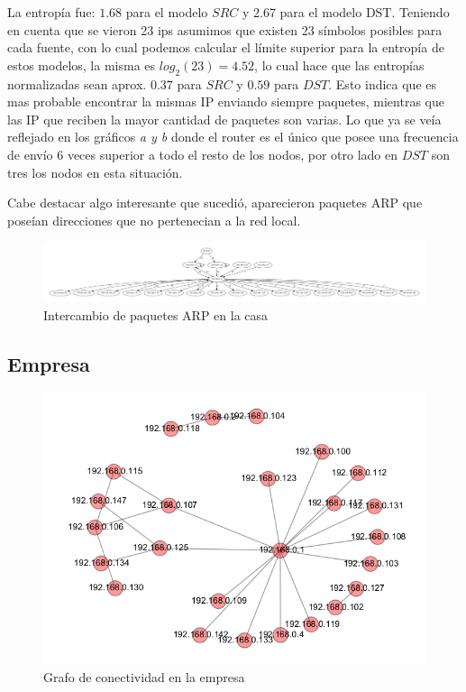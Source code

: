 La entrop\'ia fue: $1.68$ para el modelo $SRC$ y $2.67$ para el modelo DST.
Teniendo en cuenta que se vieron 23 ips asumimos que existen 23 s\'imbolos
posibles para cada fuente, con lo cual podemos calcular el l\'imite
superior para la entrop\'ia de estos modelos, la misma es $log_2(23)=4.52$, lo 
cual hace que las entrop\'ias normalizadas sean aprox. $0.37$ para $SRC$ y 
$0.59$ para $DST$. Esto indica que es mas probable encontrar la mismas 
IP enviando siempre paquetes, mientras que las IP que reciben la mayor
cantidad de paquetes son varias. Lo que ya se ve\'ia reflejado en los gr\'aficos
\emph{a y b} donde el router es el \'unico que posee una frecuencia de
env\'io 6 veces superior a todo el resto de los nodos, por otro lado en $DST$
son tres los nodos en esta situaci\'on.

Cabe destacar algo interesante que sucedi\'o, aparecieron paquetes ARP que
pose\'ian direcciones que no pertenecian a la red local.


\begin{figure}[!h]
	  \hspace{-5em}
	  \includegraphics[scale=0.25]{resultados/casa/conectividad.pdf}
	  \caption{Intercambio de paquetes ARP en la casa}
	  \label{fig:contra1}
\end{figure}


\subsection{Empresa}

\begin{figure}[!h]
	\begin{center}
		  \includegraphics[scale=0.6]{resultados/empresa/conectividadNX.png}
		  \caption{Grafo de conectividad en la empresa}
		  \label{fig:contra1}
	\end{center}
\end{figure}

